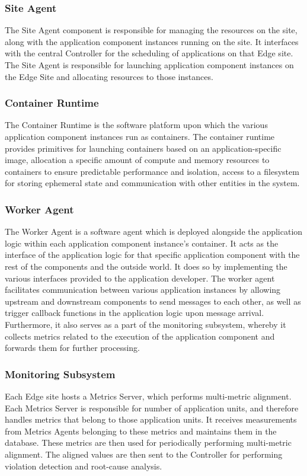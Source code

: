 \subsubsection{Site Agent}
The Site Agent component is responsible for managing the resources on the site, along with the application component instances running on the site. It interfaces with the central Controller for the scheduling of applications on that Edge site. The Site Agent is responsible for launching application component instances on the Edge Site and allocating resources to those instances.

\subsubsection{Container Runtime}
The Container Runtime is the software platform upon which the various application component instances run as containers. The container runtime provides primitives for launching containers based on an application-specific image, allocation a specific amount of compute and memory resources to containers to ensure predictable performance and isolation, access to a filesystem for storing ephemeral state and communication with other entities in the system. 

\subsubsection{Worker Agent}
The Worker Agent is a software agent which is deployed alongside the application logic within each application component instance's container. It acts as the interface of the application logic for that specific application component with the rest of the components and the outside world. It does so by implementing the various interfaces provided to the application developer. The worker agent facilitates communication between various application instances by allowing upstream and downstream components to send messages to each other, as well as trigger callback functions in the application logic upon message arrival. Furthermore, it also serves as a part of the monitoring subsystem, whereby it collects metrics related to the execution of the application component and forwards them for further processing.

\subsubsection{Monitoring Subsystem}
Each Edge site hosts a Metrics Server, which performs multi-metric alignment. Each Metrics Server is responsible for number of application units, and therefore handles metrics that belong to those application units. It receives measurements from Metrics Agents belonging to these metrics and maintains them in the database. These metrics are then used for periodically performing multi-metric alignment. The aligned values are then sent to the Controller for performing violation detection and root-cause analysis.

